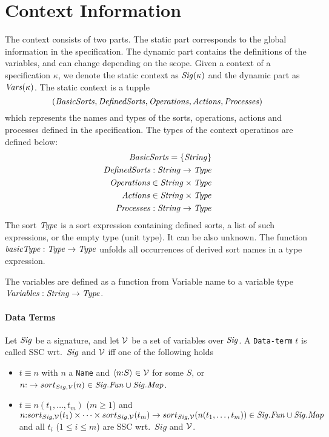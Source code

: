 \documentclass[fleqn,a4paper,dvips]{article}
\newcommand{\Sig}{\nm{Sig}}
\newcommand{\Fun}{\nm{Fun}}
\newcommand{\NV}{{\cal V}}
\newcommand{\Type}{\nm{Type}}
\newcommand{\String}{\nm{String}}
\begin{document}
\section{Context Information}
The context consists of two parts. The static part corresponds to the
global information in the specification. The dynamic part contains the
definitions of the variables, and can change depending on the scope.
Given a context of a specification $\kappa$, we denote the static context as 
$\mathit{Sig(\kappa)}$ and the dynamic part as $\mathit{Vars}(\kappa)$. 
The static context is a tupple 
\[(\mathit{BasicSorts},\mathit{DefinedSorts},\mathit{Operations},\mathit{Actions},\mathit{Processes})\]
which represents the names and types of the sorts, operations, actions and processes 
defined in the specification.
The types of the context operatinos are defined below:
\begin{align*}
\nm{BasicSorts}=\set{\String}\\
\func{\nm{DefinedSorts}}{\String}{\Type}\\
\nm{Operations}\in\String\x\Type\\
\nm{Actions}\in\String\x\Type\\
\func{\nm{Processes}}{\String}{\Type}
\end{align*}
The sort $\Type$ is a sort expression containing defined sorts, a list
of such expressions, or the empty type (unit type).  It can be also
unknown.  The function $\func{\nm{basicType}}{\Type}{\Type}$ unfolds
all occurrences of derived sort names in a type expression.

The variables are defined as a function from Variable name to a variable type
$\func{\nm{Variables}}{\String}{\Type}$.

\paragraph{Data Terms}
Let $\Sig$ be a signature, and let $\NV$ be a set of variables over
$\Sig$.
A {\tt Data-term} $t$ is called SSC wrt.\ $\Sig$ and $\NV$ iff one of
the following holds
\begin{itemize}
\item
  $t\equiv n$ with $n$ a {\tt Name} and
  $\langle n\ap S\rangle\in \NV$ for some $S$, or
  $n\ap  \rightarrow sort_{Sig,\NV}(n)\in \Sig.\Fun\cup\Sig.\Map$.
\item
  $t\equiv n(t_1,\ldots,t_m)$ ($m\geq 1$) and
  $n\ap sort_{Sig,\NV}(t_1)\times\cdots\times sort_{Sig,\NV}(t_m)
  \rightarrow sort_{Sig,\NV}(n(t_1,\ldots,t_m))\in \Sig.\Fun\cup\Sig.\Map$ and
  all
  $t_i$ ($1\leq i\leq m$) are SSC wrt.\ $Sig$ and $\NV$.
\end{itemize}
\end{document}
